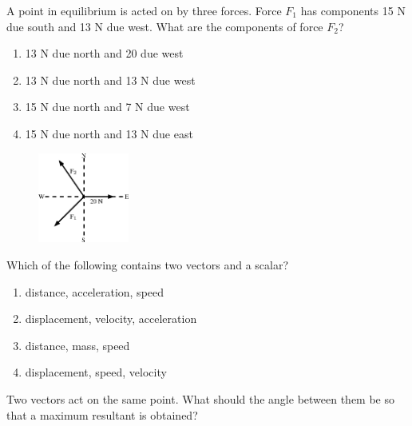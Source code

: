                 \label{m38819*uid97}\item A point in equilibrium is acted on by three forces. Force ${F}_{1}$ has components 15 N due south and 13 N due west. What are the components of force ${F}_{2}$?
\label{m38819*id197809}\begin{enumerate}[noitemsep, label=\textbf{\alph*}. ] 
            \label{m38819*uid98}\item 13 N due north and 20 due west
\label{m38819*uid99}\item 13 N due north and 13 N due west
\label{m38819*uid100}\item 15 N due north and 7 N due west
\label{m38819*uid101}\item 15 N due north and 13 N due east
\end{enumerate}
    \setcounter{subfigure}{0}
	\begin{figure}[H] %
    \begin{center}
    \label{m38819*id197871!!!underscore!!!media}\label{m38819*id197871!!!underscore!!!printimage}\includegraphics[width=3cm]{col11305.imgs/m38819_PG11C1_079.png} %
      \vspace{2pt}
    \vspace{.1in}
    \end{center}
 \end{figure}               \label{m38819*uid102}\item Which of the following contains two vectors and a scalar?
\label{m38819*id197890}\begin{enumerate}[noitemsep, label=\textbf{\alph*}. ] 
            \label{m38819*uid103}\item distance, acceleration, speed
\label{m38819*uid104}\item displacement, velocity, acceleration
\label{m38819*uid105}\item distance, mass, speed
\label{m38819*uid106}\item displacement, speed, velocity
\end{enumerate}
                \label{m38819*uid107}\item Two vectors act on the same point. What should the angle between them be so that a maximum resultant is obtained?
